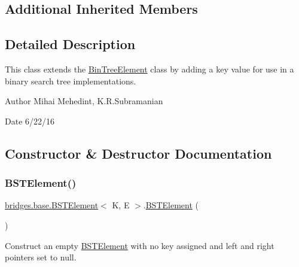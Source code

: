 \subsection*{Additional Inherited Members}


\subsection{Detailed Description}
This class extends the \hyperlink{classbridges_1_1base_1_1_bin_tree_element}{Bin\+Tree\+Element} class by adding a \textquotesingle{}key\textquotesingle{} value for use in a binary search tree implementations. 

\begin{DoxyAuthor}{Author}
Mihai Mehedint, K.\+R.\+Subramanian
\end{DoxyAuthor}
\begin{DoxyDate}{Date}
6/22/16 
\end{DoxyDate}


\subsection{Constructor \& Destructor Documentation}
\hypertarget{classbridges_1_1base_1_1_b_s_t_element_a5a557bf3e29e2936c244147c69e04795}{}\label{classbridges_1_1base_1_1_b_s_t_element_a5a557bf3e29e2936c244147c69e04795} 
\subsubsection{\texorpdfstring{B\+S\+T\+Element()}{BSTElement()}\hspace{0.1cm}{\footnotesize\ttfamily [1/8]}}
{\footnotesize\ttfamily \hyperlink{classbridges_1_1base_1_1_b_s_t_element}{bridges.\+base.\+B\+S\+T\+Element}$<$ K, E $>$.\hyperlink{classbridges_1_1base_1_1_b_s_t_element}{B\+S\+T\+Element} (\begin{DoxyParamCaption}{ }\end{DoxyParamCaption})}

Construct an empty \hyperlink{classbridges_1_1base_1_1_b_s_t_element}{B\+S\+T\+Element} with no key assigned and left and right pointers set to null. \hypertarget{classbridges_1_1base_1_1_b_s_t_element_a0ec94ad6e2313ada05b48eb83a2f31cb}{}\label{classbridges_1_1base_1_1_b_s_t_element_a0ec94ad6e2313ada05b48eb83a2f31cb} 
